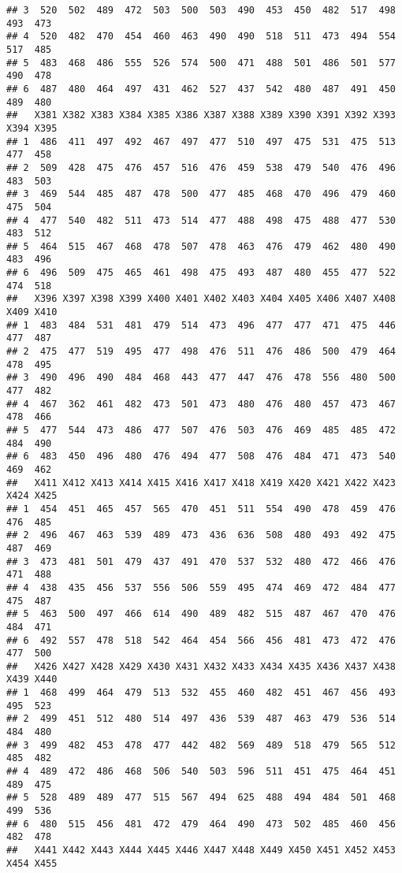 \documentclass[
]{article}
\begin{document}
\begin{verbatim}
## 3  520  502  489  472  503  500  503  490  453  450  482  517  498  493  473
## 4  520  482  470  454  460  463  490  490  518  511  473  494  554  517  485
## 5  483  468  486  555  526  574  500  471  488  501  486  501  577  490  478
## 6  487  480  464  497  431  462  527  437  542  480  487  491  450  489  480
##   X381 X382 X383 X384 X385 X386 X387 X388 X389 X390 X391 X392 X393 X394 X395
## 1  486  411  497  492  467  497  477  510  497  475  531  475  513  477  458
## 2  509  428  475  476  457  516  476  459  538  479  540  476  496  483  503
## 3  469  544  485  487  478  500  477  485  468  470  496  479  460  475  504
## 4  477  540  482  511  473  514  477  488  498  475  488  477  530  483  512
## 5  464  515  467  468  478  507  478  463  476  479  462  480  490  483  496
## 6  496  509  475  465  461  498  475  493  487  480  455  477  522  474  518
##   X396 X397 X398 X399 X400 X401 X402 X403 X404 X405 X406 X407 X408 X409 X410
## 1  483  484  531  481  479  514  473  496  477  477  471  475  446  477  487
## 2  475  477  519  495  477  498  476  511  476  486  500  479  464  478  495
## 3  490  496  490  484  468  443  477  447  476  478  556  480  500  477  482
## 4  467  362  461  482  473  501  473  480  476  480  457  473  467  478  466
## 5  477  544  473  486  477  507  476  503  476  469  485  485  472  484  490
## 6  483  450  496  480  476  494  477  508  476  484  471  473  540  469  462
##   X411 X412 X413 X414 X415 X416 X417 X418 X419 X420 X421 X422 X423 X424 X425
## 1  454  451  465  457  565  470  451  511  554  490  478  459  476  476  485
## 2  496  467  463  539  489  473  436  636  508  480  493  492  475  487  469
## 3  473  481  501  479  437  491  470  537  532  480  472  466  476  471  488
## 4  438  435  456  537  556  506  559  495  474  469  472  484  477  475  487
## 5  463  500  497  466  614  490  489  482  515  487  467  470  476  484  471
## 6  492  557  478  518  542  464  454  566  456  481  473  472  476  477  500
##   X426 X427 X428 X429 X430 X431 X432 X433 X434 X435 X436 X437 X438 X439 X440
## 1  468  499  464  479  513  532  455  460  482  451  467  456  493  495  523
## 2  499  451  512  480  514  497  436  539  487  463  479  536  514  484  480
## 3  499  482  453  478  477  442  482  569  489  518  479  565  512  485  482
## 4  489  472  486  468  506  540  503  596  511  451  475  464  451  489  475
## 5  528  489  489  477  515  567  494  625  488  494  484  501  468  499  536
## 6  480  515  456  481  472  479  464  490  473  502  485  460  456  482  478
##   X441 X442 X443 X444 X445 X446 X447 X448 X449 X450 X451 X452 X453 X454 X455

\end{verbatim}
\end{document}

